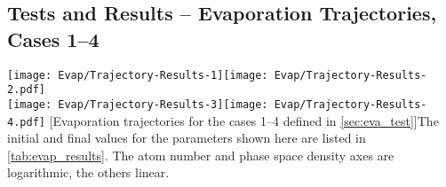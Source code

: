 \pagebreak
\subsection{Tests and Results -- Evaporation Trajectories, Cases 1--4}
\vfill
\noindent\begin{minipage}[c]{\linewidth}
    \centering
    \texttt{[image: Evap/Trajectory-Results-1]}\hfill\texttt{[image: Evap/Trajectory-Results-2.pdf]} \\[\baselineskip]
    \noindent\texttt{[image: Evap/Trajectory-Results-3]}\hfill\texttt{[image: Evap/Trajectory-Results-4.pdf]}
    [Evaporation trajectories for the cases 1--4 defined in \cref{sec:eva_test}]{The initial and final values for the parameters shown here are listed in \cref{tab:evap_results}. The atom number and phase space density axes are logarithmic, the others linear.}
    \label{fig:eva_cases14}
\end{minipage}
\vfill